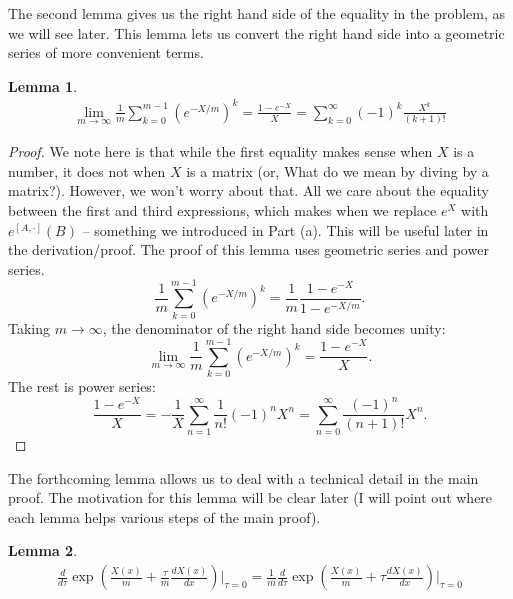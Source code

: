 \documentclass{article}
\theoremstyle{definition}
\newtheorem{lemma}{Lemma}
\newcommand{\f}[2]{\frac{#1}{#2}}
\newcommand{\lp}{\left(}
\newcommand{\rp}{\right)}
\begin{document}
\begin{enumerate}[label=(\alph*)]
	The second lemma gives us the right hand side of the equality in the problem, as we will see later. This lemma lets us convert the right hand side into a geometric series of more convenient terms. 
	\begin{lemma}\label{lem:2}
		\begin{align*}
		\lim_{m\to \infty} \f{1}{m} \sum^{m-1}_{k=0} \lp e^{-X/m} \rp^k = \f{1-e^{-X}}{X} = \sum^\infty_{k=0} (-1)^k \f{X^k}{(k+1)!}
		\end{align*}
	\end{lemma}
	\begin{proof}
		We note here is that while the first equality makes sense when $X$ is a number, it does not when $X$ is a matrix (or, What do we mean by diving by a matrix?). However, we won't worry about that. All we care about the equality between the first and third expressions, which makes when we replace $e^X$ with $e^{[A,\cdot]}(B)$ -- something we introduced in Part (a). This will be useful later in the derivation/proof. The proof of this lemma uses geometric series and power series. 
		\begin{equation*}
		\f{1}{m}\sum^{m-1}_{k=0} \lp e^{-X/m} \rp^k = \f{1}{m}  \f{1-e^{-X}}{1-e^{-X/m}}. 
		\end{equation*}
		Taking $m\to \infty$, the denominator of the right hand side becomes unity: 
		\begin{equation*}
		\lim_{m\to \infty} \f{1}{m} \sum^{m-1}_{k=0} \lp e^{-X/m} \rp^k = \f{1-e^{-X}}{X}.
		\end{equation*}
		The rest is power series:
		\begin{equation*}
		\f{1-e^{-X}}{X} = -\f{1}{X} \sum^\infty_{n=1} \f{1}{n!}(-1)^nX^n = \sum^\infty_{n=0} \f{(-1)^{n}}{(n+1)!}X^{n}.
		\end{equation*}
	\end{proof}
	The forthcoming lemma allows us to deal with a technical detail in the main proof. The motivation for this lemma will be clear later (I will point out where each lemma helps various steps of the main proof). 
	\begin{lemma}\label{lem:3}
		\begin{align*}
		\f{d}{d\tau} \exp\lp \f{X(x)}{m} + \f{\tau}{m} \f{dX(x)}{dx}\rp \bigg\vert_{\tau = 0} = \f{1}{m} \f{d}{d\tau} \exp\lp \f{X(x)}{m} + \tau \f{dX(x)}{dx}\rp \bigg\vert_{\tau = 0} 
		\end{align*}
	\end{lemma}


\end{enumerate}
\end{document}
